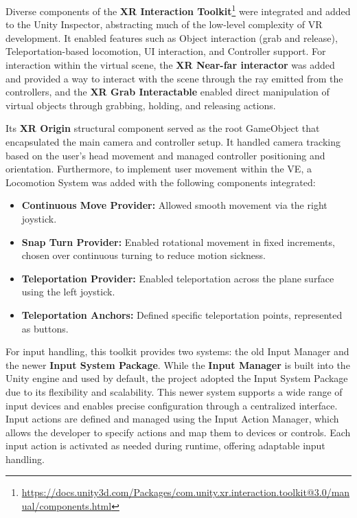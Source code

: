 Diverse components of the \textbf{XR Interaction Toolkit}\footnote{\url{https://docs.unity3d.com/Packages/com.unity.xr.interaction.toolkit@3.0/manual/components.html}} were integrated and added to the Unity Inspector, abstracting much of the low-level complexity of \gls{VR} development. It enabled features such 
as Object interaction (grab and release), Teleportation-based locomotion, \gls{UI} interaction, and Controller support.
For interaction within the virtual scene, the \textbf{XR Near-far interactor} was added and provided a way to interact with the scene through the ray emitted from the controllers, and the \textbf{XR Grab Interactable} enabled direct manipulation of virtual objects through grabbing, holding, and releasing actions.

Its \textbf{XR Origin} structural component served as the root GameObject that encapsulated the main camera and controller setup. 
It handled camera tracking based on the user's head movement and managed controller positioning and orientation. 
Furthermore, to implement user movement within the \gls{VE}, a Locomotion System was added with the following components integrated: 

\begin{itemize}
\item{\textbf{Continuous Move Provider:}  Allowed smooth movement via the right joystick.}
\item{\textbf{Snap Turn Provider:}  Enabled rotational movement in fixed increments, chosen over continuous turning to reduce motion sickness.}
\item{\textbf{Teleportation Provider:} Enabled teleportation across the plane surface using the left joystick.}
\item{\textbf{Teleportation Anchors:} Defined specific teleportation points, represented as buttons.}
\end{itemize}

For input handling, this toolkit provides two systems: the old Input Manager and the newer \textbf{Input System Package}. 
While the \textbf{Input Manager} is built into the Unity engine and used by default, the project adopted the Input System Package due to its flexibility and scalability. 
This newer system supports a wide range of input devices and enables precise configuration through a centralized interface. Input actions are defined and managed using the Input Action Manager, which allows the developer to specify actions and map them to devices or controls. 
Each input action is activated as needed during runtime, offering adaptable input handling.



